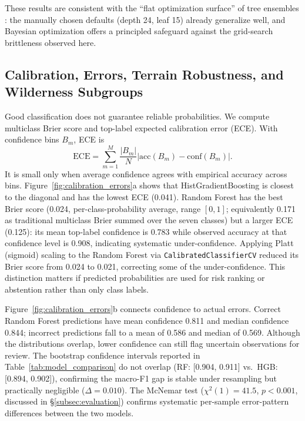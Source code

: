 \documentclass{article}
\begin{document}
These results are consistent with the ``flat optimization surface'' of tree ensembles \cite{probst2019}: the manually chosen defaults (depth 24, leaf 15) already generalize well, and Bayesian optimization offers a principled safeguard against the grid-search brittleness observed here.

\FloatBarrier
\subsection{Calibration, Errors, Terrain Robustness, and Wilderness Subgroups}

Good classification does not guarantee reliable probabilities. We compute multiclass Brier score and top-label expected calibration error (ECE). With confidence bins $B_m$, ECE is
\begin{equation}
\text{ECE}=\sum_{m=1}^{M}\frac{|B_m|}{N}
\left|\text{acc}(B_m)-\text{conf}(B_m)\right|.
\label{eq:ece}
\end{equation}
It is small only when average confidence agrees with empirical accuracy across bins. Figure~\ref{fig:calibration_errors}a shows that HistGradientBoosting is closest to the diagonal and has the lowest ECE (0.041). Random Forest has the best Brier score (0.024, per-class-probability average, range $[0,1]$; equivalently 0.171 as traditional multiclass Brier summed over the seven classes) but a larger ECE (0.125): its mean top-label confidence is 0.783 while observed accuracy at that confidence level is 0.908, indicating systematic under-confidence.  Applying Platt (sigmoid) scaling to the Random Forest via \texttt{CalibratedClassifierCV} reduced its Brier score from 0.024 to 0.021, correcting some of the under-confidence.  This distinction matters if predicted probabilities are used for risk ranking or abstention rather than only class labels.

Figure~\ref{fig:calibration_errors}b connects confidence to actual errors. Correct Random Forest predictions have mean confidence 0.811 and median confidence 0.844; incorrect predictions fall to a mean of 0.586 and median of 0.569. Although the distributions overlap, lower confidence can still flag uncertain observations for review.  The bootstrap confidence intervals reported in Table~\ref{tab:model_comparison} do not overlap (RF: [0.904, 0.911] vs.\ HGB: [0.894, 0.902]), confirming the macro-F1 gap is stable under resampling but practically negligible ($\Delta=0.010$).  The McNemar test ($\chi^2(1)=41.5$, $p<0.001$, discussed in \S\ref{subsec:evaluation}) confirms systematic per-sample error-pattern differences between the two models.
\end{document}
